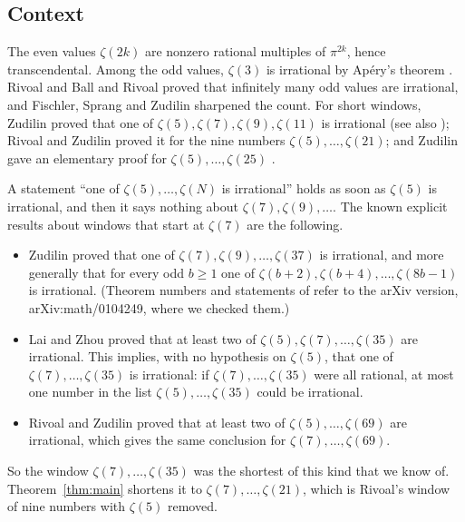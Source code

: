 \documentclass[11pt]{amsart}
\theoremstyle{definition}
\theoremstyle{remark}
\numberwithin{equation}{section}
\begin{document}
\subsection{Context}
The even values $\zeta(2k)$ are nonzero rational multiples of $\pi^{2k}$, hence transcendental. Among the odd
values, $\zeta(3)$ is irrational by Ap\'ery's theorem \cite{Apery1979}. Rivoal \cite{Rivoal2000} and Ball and
Rivoal \cite{BallRivoal2001} proved that infinitely many odd values are irrational, and
Fischler, Sprang and Zudilin \cite{FSZ2019} sharpened the count. For short windows, Zudilin
\cite{Zudilin2001} proved that one of $\zeta(5),\zeta(7),\zeta(9),\zeta(11)$ is irrational (see also
\cite[Thm.~3]{Zudilin2004}); Rivoal \cite{Rivoal2002} and Zudilin \cite[Thm.~1]{Zudilin2002} proved it for
the nine numbers $\zeta(5),\dots,\zeta(21)$; and Zudilin gave an elementary proof for
$\zeta(5),\dots,\zeta(25)$ \cite{Zudilin2018}.

A statement ``one of $\zeta(5),\dots,\zeta(N)$ is irrational'' holds as soon as $\zeta(5)$ is irrational, and
then it says nothing about $\zeta(7),\zeta(9),\dots$. The known explicit results about windows that start at
$\zeta(7)$ are the following.
\begin{itemize}
\item Zudilin \cite[Thm.~1]{Zudilin2002} proved that one of $\zeta(7),\zeta(9),\dots,\zeta(37)$ is irrational,
  and more generally \cite[Thm.~2]{Zudilin2002} that for every odd $b\ge1$ one of
  $\zeta(b+2),\zeta(b+4),\dots,\zeta(8b-1)$ is irrational. (Theorem numbers and statements of \cite{Zudilin2002}
  refer to the arXiv version, arXiv:math/0104249, where we checked them.)
\item Lai and Zhou \cite{LaiZhou2022} proved that at least two of $\zeta(5),\zeta(7),\dots,\zeta(35)$ are
  irrational. This implies, with no hypothesis on $\zeta(5)$, that one of $\zeta(7),\dots,\zeta(35)$ is
  irrational: if $\zeta(7),\dots,\zeta(35)$ were all rational, at most one number in the list
  $\zeta(5),\dots,\zeta(35)$ could be irrational.
\item Rivoal and Zudilin \cite{RivoalZudilin2020} proved that at least two of $\zeta(5),\dots,\zeta(69)$ are
  irrational, which gives the same conclusion for $\zeta(7),\dots,\zeta(69)$.
\end{itemize}
So the window $\zeta(7),\dots,\zeta(35)$ was the shortest of this kind that we know of. Theorem~\ref{thm:main}
shortens it to $\zeta(7),\dots,\zeta(21)$, which is Rivoal's window of nine numbers with $\zeta(5)$ removed.
\end{document}
